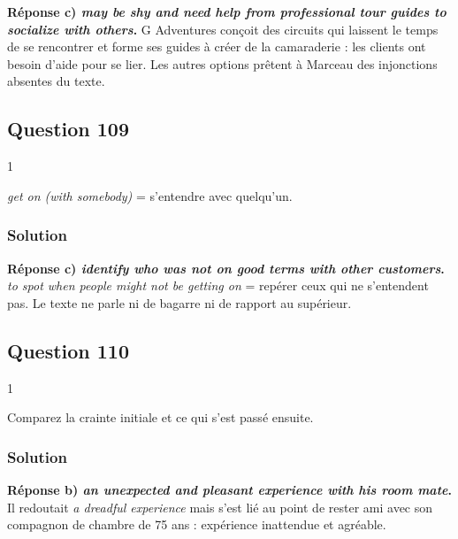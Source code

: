 \documentclass[11pt,a4paper]{article}
\begin{document}
\textbf{Réponse c) \emph{may be shy and need help from professional tour guides to socialize with others}.} G Adventures conçoit des circuits qui laissent le temps de se rencontrer et forme ses guides à créer de la camaraderie : les clients ont besoin d'aide pour se lier. Les autres options prêtent à Marceau des injonctions absentes du texte.

\hypertarget{question-109}{%
\subsection{Question 109}\label{question-109}}

\begin{indication}{1}

\emph{get on (with somebody)} = s'entendre avec quelqu'un.

\end{indication}

\hypertarget{solution-108}{%
\subsubsection{Solution}\label{solution-108}}

\textbf{Réponse c) \emph{identify who was not on good terms with other customers}.} \emph{to spot when people might not be getting on} = repérer ceux qui ne s'entendent pas. Le texte ne parle ni de bagarre ni de rapport au supérieur.

\hypertarget{question-110}{%
\subsection{Question 110}\label{question-110}}

\begin{indication}{1}

Comparez la crainte initiale et ce qui s'est passé ensuite.

\end{indication}

\hypertarget{solution-109}{%
\subsubsection{Solution}\label{solution-109}}

\textbf{Réponse b) \emph{an unexpected and pleasant experience with his room mate}.} Il redoutait \emph{a dreadful experience} mais s'est lié au point de rester ami avec son compagnon de chambre de 75 ans : expérience inattendue et agréable.
\end{document}
